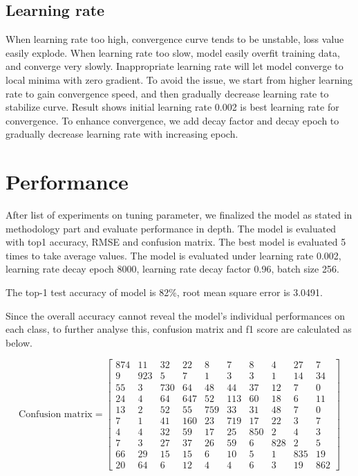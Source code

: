 \documentclass[journal,onecolumn]{IEEEtran}
\begin{document}
\subsection{Learning rate}
When learning rate too high, convergence curve tends to be unstable, loss value easily explode. When learning rate too slow, model easily overfit training data, and converge very slowly. Inappropriate learning rate will let model converge to local minima with zero gradient. To avoid the issue, we start from higher learning rate to gain convergence speed, and then gradually decrease learning rate to stabilize curve. Result shows initial learning rate 0.002 is best learning rate for convergence. To enhance convergence, we add decay factor and decay epoch to gradually decrease learning rate with increasing epoch.

\section{Performance}
After list of experiments on tuning parameter, we finalized the model as stated in methodology part and evaluate performance in depth. The model is evaluated with top1 accuracy, RMSE and confusion matrix. The best model is evaluated 5 times to take average values. The model is evaluated under learning rate 0.002, learning rate decay epoch 8000, learning rate decay factor 0.96, batch size 256.

The top-1 test accuracy of model is 82\%, root mean square error is 3.0491. 

Since the overall accuracy cannot reveal the model’s individual performances on each class, to further analyse this, confusion matrix and f1 score are calculated as below.

\[
\textrm{Confusion matrix} =
\begin{bmatrix}
 874 &  11 &  32 &  22 &   8 &   7 &   8 &   4 &  27 &   7\\
   9 & 923 &   5 &   7 &   1 &   3 &   3 &   1 &  14 &  34\\
  55 &   3 & 730 &  64 &  48 &  44 &  37 &  12 &   7 &   0\\
  24 &   4 &  64 & 647 &  52 & 113 &  60 &  18 &   6 &  11\\
  13 &   2 &  52 &  55 & 759 &  33 &  31 &  48 &   7 &   0\\
   7 &   1 &  41 & 160 &  23 & 719 &  17 &  22 &   3 &   7\\
   4 &   4 &  32 &  59 &  17 &  25 & 850 &   2 &   4 &   3\\
   7 &   3 &  27 &  37 &  26 &  59 &   6 & 828 &   2 &   5\\
  66 &  29 &  15 &  15 &   6 &  10 &   5 &   1 & 835 &  19\\
  20 &  64 &   6 &  12 &   4 &   4 &   6 &   3 &  19 & 862
\end{bmatrix}
\]
\end{document}
